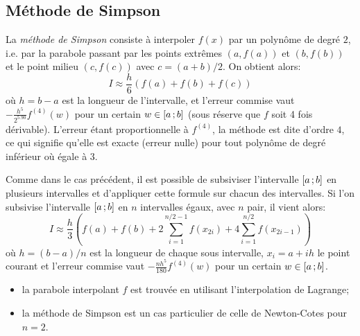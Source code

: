 \subsection{Méthode de Simpson} 
La \emph{méthode de Simpson} consiste à interpoler $f(x)$ par un polynôme de degré $2$, i.e. par la parabole passant par les points extrêmes $(a,f(a))$ et $(b,f(b))$ et le point milieu $(c,f(c))$ avec $c=(a+b)/2$. On obtient alors: 
\begin{equation}
 I\approx \frac{h}{6} \left( f(a)+f(b)+f(c)\right)
\end{equation}
où $h=b-a$ est la longueur de l'intervalle, et l'erreur commise vaut $-\frac{h^5}{2^5.90} f^{(4)}(w)$ pour un certain $w\in\mathopen{[}a\,;b\mathclose{]}$ (sous réserve que $f$ soit 4 fois dérivable). L'erreur étant proportionnelle à $f^{(4)}$, la méthode est dite d'ordre $4$, ce qui signifie qu'elle est exacte (erreur nulle) pour tout polynôme de degré inférieur où égale à 3. 

Comme dans le cas précédent, il est possible de subsiviser l'intervalle $\mathopen{[}a\,;b\mathclose{]}$ en plusieurs intervalles et d'appliquer cette formule sur chacun des intervalles. Si l'on subsivise l'intervalle $\mathopen{[}a\,;b\mathclose{]}$ en $n$ intervalles égaux, avec $n$ pair, il vient alors: 
\begin{equation}
 I\approx \frac{h}{3} \left( f(a)+f(b)+2\sum_{i=1}^{n/2-1}f(x_{2i})+4\sum_{i=1}^{n/2}f(x_{2i-1}) \right)
\end{equation}
où $h=(b-a)/n$ est la longueur de chaque sous intervalle, $x_i=a+ih$ le point courant et l'erreur commise vaut $-\frac{nh^5}{180} f^{(4)}(w)$ pour un certain $w\in\mathopen{[}a\,;b\mathclose{]}$. 
\begin{remarque}[Remarques]\mbox{}
\begin{itemize}
\item la parabole interpolant $f$ est trouvée en utilisant l'interpolation de Lagrange; 
\item la méthode de Simpson est un cas particulier de celle de Newton-Cotes pour $n=2$. 
\end{itemize}
\end{remarque}
